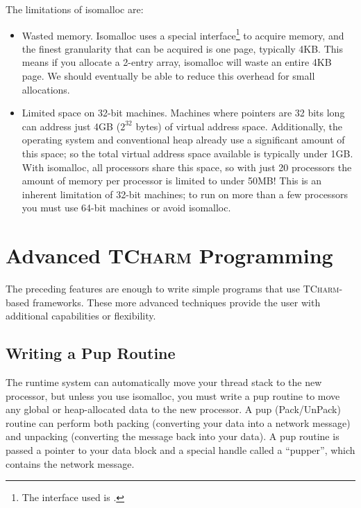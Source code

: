 \documentclass[10pt]{article}
\newcommand{\tcharm}{\textsc{TCharm}}
\begin{document}
The limitations of isomalloc are:
\begin{itemize}
\item Wasted memory.  Isomalloc uses a special interface\footnote{
The interface used is .} to acquire memory, and the finest granularity
that can be acquired is one page, typically 4KB.  This means if you allocate
a 2-entry array, isomalloc will waste an entire 4KB page.  We should eventually 
be able to reduce this overhead for small allocations.

\item Limited space on 32-bit machines.  Machines where pointers are 32 bits
long can address just 4GB ($2^32$ bytes) of virtual address space.  Additionally, 
the operating system and conventional heap already use a significant amount 
of this space; so the total virtual address space available is typically under 1GB.  
With isomalloc, all processors share this space, so with just 20 processors
the amount of memory per processor is limited to under 50MB!  This is an 
inherent limitation of 32-bit machines; to run on more than a few processors you 
must use 64-bit machines or avoid isomalloc.
\end{itemize}



\section{Advanced \tcharm{} Programming}
The preceding features are enough to write simple programs
that use \tcharm{}-based frameworks.  These more advanced techniques
provide the user with additional capabilities or flexibility.


\subsection{Writing a Pup Routine}
\label{sec:pup}

The runtime system can automatically move your thread stack to the new
processor, but unless you use isomalloc, you must write a pup routine to 
move any global or heap-allocated data to the new processor.  A pup
(Pack/UnPack) routine can perform both packing (converting your data into a
network message) and unpacking (converting the message back into your data).  
A pup routine is passed a pointer to your data block and a
special handle called a ``pupper'', which contains the network message.  
\end{document}
